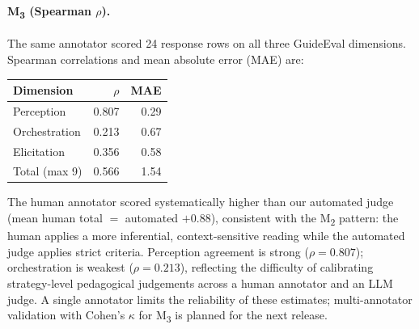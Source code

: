 \documentclass[11pt]{article}
\begin{document}
\paragraph{M\textsubscript{3} (Spearman $\rho$).}
The same annotator scored 24 response rows on all three GuideEval dimensions.
Spearman correlations and mean absolute error (MAE) are:

\begin{center}
\small
\begin{tabular}{lrr}
\toprule
\textbf{Dimension} & $\rho$ & MAE \\
\midrule
Perception     & 0.807 & 0.29 \\
Orchestration  & 0.213 & 0.67 \\
Elicitation    & 0.356 & 0.58 \\
\midrule
Total (max 9)  & 0.566 & 1.54 \\
\bottomrule
\end{tabular}
\end{center}

The human annotator scored systematically higher than our automated judge
(mean human total $= $ automated $+ 0.88$), consistent with the
M\textsubscript{2} pattern: the human applies a more inferential,
context-sensitive reading while the automated judge applies strict criteria.
Perception agreement is strong ($\rho = 0.807$); orchestration is weakest
($\rho = 0.213$), reflecting the difficulty of calibrating strategy-level
pedagogical judgements across a human annotator and an LLM judge.
A single annotator limits the reliability of these estimates; multi-annotator
validation with Cohen's $\kappa$ for M\textsubscript{3} is planned for the
next release.
\end{document}
